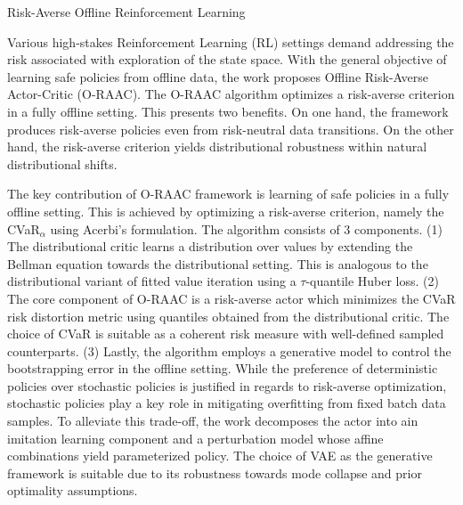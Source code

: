 \documentclass[11pt,letterpaper]{article}
\begin{document}
\begin{center}
  \large{Risk-Averse Offline Reinforcement Learning}
\end{center}

Various high-stakes Reinforcement Learning (RL) settings demand addressing the risk associated with exploration of the state space. With the general objective of learning safe policies from offline data, the work proposes Offline Risk-Averse Actor-Critic (O-RAAC). The O-RAAC algorithm optimizes a risk-averse criterion in a fully offline setting. This presents two benefits. On one hand, the framework produces risk-averse policies even from risk-neutral data transitions. On the other hand, the risk-averse criterion yields distributional robustness within natural distributional shifts.

The key contribution of O-RAAC framework is learning of safe policies in a fully offline setting. This is achieved by optimizing a risk-averse criterion, namely the CVaR$_{\alpha}$ using Acerbi's formulation. The algorithm consists of 3 components. (1) The distributional critic learns a distribution over values by extending the Bellman equation towards the distributional setting. This is analogous to the distributional variant of fitted value iteration using a $\tau$-quantile Huber loss. (2) The core component of O-RAAC is a risk-averse actor which minimizes the CVaR risk distortion metric using quantiles obtained from the distributional critic. The choice of CVaR is suitable as a coherent risk measure with well-defined sampled counterparts. (3) Lastly, the algorithm employs a generative model to control the bootstrapping error in the offline setting. While the preference of deterministic policies over stochastic policies is justified in regards to risk-averse optimization, stochastic policies play a key role in mitigating overfitting from fixed batch data samples. To alleviate this trade-off, the work decomposes the actor into ain imitation learning component and a perturbation model whose affine combinations yield parameterized policy. The choice of VAE as the generative framework is suitable due to its robustness towards mode collapse and prior optimality assumptions.
\end{document}
